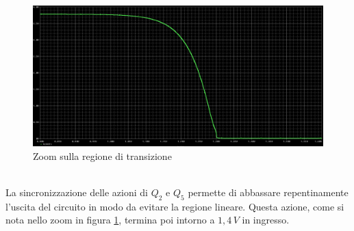 \documentclass[12pt, a4paper]{report}
\begin{document}
\begin{figure}[h]
    \centering
    \includegraphics[scale=0.35,angle=0]{ttl_not_std_transfer_zoom.png}
    \caption{Zoom sulla regione di transizione}
    \label{std_zoom}
\end{figure}
\\La sincronizzazione delle azioni di $Q_2$ e $Q_5$ permette di abbassare repentinamente l'uscita del circuito in modo da evitare la regione lineare. Questa azione, come si nota nello zoom in figura \ref{std_zoom}, termina poi intorno a $1,4\,V$ in ingresso.
\end{document}
